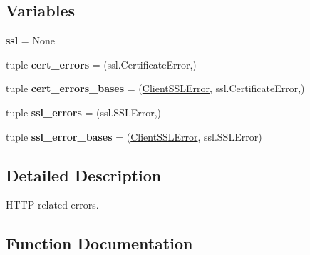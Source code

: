 \subsection*{Variables}
\begin{DoxyCompactItemize}
\item 
\mbox{\label{namespaceaiohttp_1_1client__exceptions_a7eeccded42320a6722f3c71040ce9c4f}} 
{\bfseries ssl} = None
\item 
\mbox{\label{namespaceaiohttp_1_1client__exceptions_a38d8f2e9468ef2558ba27f4fe63c2391}} 
tuple {\bfseries cert\+\_\+errors} = (ssl.\+Certificate\+Error,)
\item 
\mbox{\label{namespaceaiohttp_1_1client__exceptions_a7bf47ad9b5eb342dc4da62a517182820}} 
tuple {\bfseries cert\+\_\+errors\+\_\+bases} = (\hyperlink{classaiohttp_1_1client__exceptions_1_1_client_s_s_l_error}{Client\+S\+S\+L\+Error}, ssl.\+Certificate\+Error,)
\item 
\mbox{\label{namespaceaiohttp_1_1client__exceptions_a3831fa91e6d0dd71d0c9b4bb25276c9b}} 
tuple {\bfseries ssl\+\_\+errors} = (ssl.\+S\+S\+L\+Error,)
\item 
\mbox{\label{namespaceaiohttp_1_1client__exceptions_ad1a4699f76c05ff0e45728436a55aec1}} 
tuple {\bfseries ssl\+\_\+error\+\_\+bases} = (\hyperlink{classaiohttp_1_1client__exceptions_1_1_client_s_s_l_error}{Client\+S\+S\+L\+Error}, ssl.\+S\+S\+L\+Error)
\end{DoxyCompactItemize}


\subsection{Detailed Description}
\begin{DoxyVerb}HTTP related errors.\end{DoxyVerb}
 

\subsection{Function Documentation}
\mbox{\label{namespaceaiohttp_1_1client__exceptions_a03625909eea6f3db6fbc8d1cea0c430a}} 
